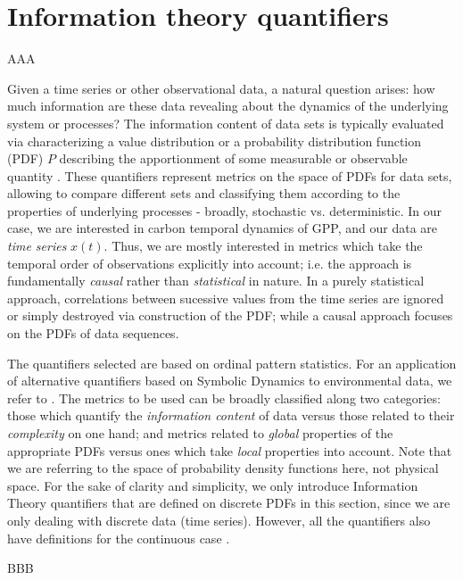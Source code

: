 \section{Information theory quantifiers}\label{sec:quanti}

AAA

Given a time series or other observational data, a natural question arises: how much information are these data revealing about the dynamics of the underlying system or processes?
The information content of data sets is typically evaluated via characterizing a value distribution or a probability distribution function (PDF) $P$ describing the apportionment of some measurable or observable quantity \cite{Gray2011}. These quantifiers represent metrics on the space of PDFs for data sets, allowing to compare different sets and classifying them according to the properties of underlying processes - broadly, stochastic vs.  deterministic. In our case, we are interested in carbon temporal dynamics of GPP, and our data are \textit{time series} $x(t)$. Thus, we are mostly interested in metrics which take the temporal order of observations explicitly into account; i.e. the approach is fundamentally \textit{causal} rather than \textit{statistical} in nature. In a purely statistical approach, correlations between sucessive values from the time series are ignored or simply destroyed via construction of the PDF; while a causal approach focuses on the PDFs of data sequences. 

The quantifiers selected are based on ordinal pattern statistics. For an application of alternative quantifiers based on Symbolic Dynamics to environmental data, we refer to \cite{Hauhs2008}. The metrics to be used can be broadly classified along two categories: those which quantify the \textit{information content} of data versus those related to their \textit{complexity} on one hand; and metrics related to \textit{global} properties of the appropriate PDFs versus ones which take \textit{local} properties into account. Note that we are referring to the space of probability density functions here, not physical space. For the sake of clarity and simplicity, we only introduce Information Theory quantifiers that are defined on discrete PDFs in this section, since we are only dealing with discrete data (time series). However, all the quantifiers also have definitions for the continuous case \cite{Shannon1948,Frieden2004} . 

BBB

